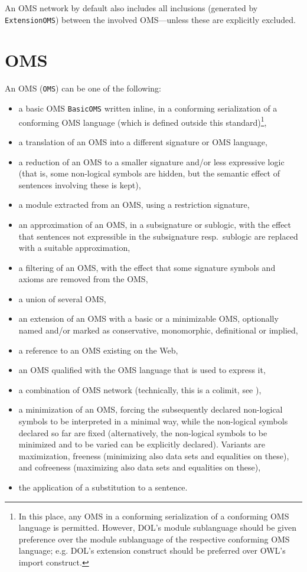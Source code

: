 \documentclass[10pt,fleqn,%
\ifpretendfinal
final%
\else
draft%
\fi,
]{scrreprt}
\makeatletter
\newcommand{\red}[1]{#1} %
\newcommand*{\eg}{e.g.\@\xspace}
\newcommand*{\syntax}[1]{\texttt{#1}}
\newcommand{\sclause}[1]{\section{#1}}
\makeatother
\begin{document}
An OMS network by default also includes all inclusions (generated by
\syntax{ExtensionOMS}) between the involved OMS---unless these are
explicitly excluded.

\sclause{OMS}\label{c:focused-OMS}

An OMS (\syntax{OMS}) can be one of the following:
\begin{itemize}
\item a basic OMS \syntax{BasicOMS} written inline, in a conforming serialization of a conforming OMS 
language (which is defined outside this standard)\footnote{In this place, any OMS in a conforming serialization of a conforming OMS language is permitted.  
However, DOL's module sublanguage should be given preference over the module sublanguage of 
the respective conforming OMS language; \eg DOL's extension construct should be preferred over OWL's import construct.},
\item a translation of an OMS into a different signature or OMS
language,
\item a reduction of an OMS to a smaller signature and/or less
expressive logic (that is,
some non-logical symbols are hidden, but the semantic effect of sentences involving these is kept),
\item a module extracted from an OMS, using a restriction signature,
\item an approximation of an OMS, in a subsignature or sublogic, with the effect that sentences not expressible in the subsignature resp.\ sublogic are replaced with a suitable approximation,
\item \red{a filtering of an OMS, with the effect that some signature symbols and axioms are removed from the OMS,}
\item a union of several OMS,
\item an extension of an OMS with a basic or a minimizable OMS, optionally named and/or marked as conservative, monomorphic, definitional or implied,
\item a reference to an OMS existing on the Web,
\item an OMS qualified with the OMS language that is used to express it,
\item a combination of OMS network (technically, this is a colimit, see \cite{ZimmermanEtAl06}),
\item a minimization of an OMS, forcing the subsequently declared
  non-logical symbols to be interpreted in a minimal way, while the non-logical symbols declared so far are fixed (alternatively, the non-logical symbols to be minimized and to be varied can be explicitly declared). \red{Variants are
maximization, freeness (minimizing also data sets and equalities on these), and cofreeness
(maximizing also data sets and equalities on these),}
\item \red{the application of a substitution to a sentence.}


\end{itemize}
\end{document}
